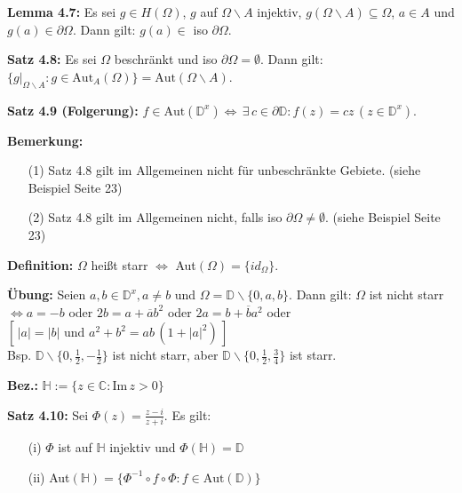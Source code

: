 \documentclass[11pt]{article}
\newcommand{\C}{\mathbb{C}}
\newcommand{\D}{\mathbb{D}}
\begin{document}
\textbf{Lemma 4.7:} Es sei $g \in H(\Omega)$, $g$ auf $\Omega \backslash A$ injektiv, $g(\Omega \backslash A) \subseteq \Omega$, $a \in A$ und $g(a) \in \partial \Omega$. Dann gilt: $g(a) \in$ iso $\partial \Omega$.

\textbf{Satz 4.8:} Es sei $\Omega$ beschränkt und iso $\partial \Omega = \emptyset$. Dann gilt: $\{ g|_{\Omega \backslash A} \colon g \in \text{Aut}_A(\Omega)\} = \text{Aut}(\Omega \backslash A)$.

\textbf{Satz 4.9 (Folgerung):} $f \in \text{Aut}(\D^x) \Leftrightarrow \, \exists \, c \in \partial \D \colon f(z) = cz \, (z \in \D^x)$.

\textbf{Bemerkung:}
\vspace{-0.6cm}
\begin{itemize}
\item[(1)] Satz 4.8 gilt im Allgemeinen nicht für unbeschränkte Gebiete. (siehe Beispiel Seite 23) \vspace{-0.2cm}
\item[(2)] Satz 4.8 gilt im Allgemeinen nicht, falls iso $\partial \Omega \neq \emptyset$. (siehe Beispiel Seite 23)
\end{itemize}
\vspace{-0.3cm}

\textbf{Definition:} $\Omega$ heißt starr $\Leftrightarrow$ Aut$(\Omega) = \{ id_\Omega\}$.

\textbf{Übung:} Seien $a,b \in \D^x, a \neq b$ und $\Omega = \D \backslash \{ 0,a,b \}$. Dann gilt: $\Omega$ ist nicht starr $\Leftrightarrow a= -b$ oder $2b = a + \overline{a}b^2$ oder $2a = b+\overline{b}a^2$ oder $[\,|a|=|b| \text{ und } a^2 + b^2 = ab\,(1+|a|^2)\,]$ \\
Bsp. $\D \backslash \{ 0, \frac{1}{2}, -\frac{1}{2}\}$ ist nicht starr, aber $\D \backslash \{ 0, \frac{1}{2}, \frac{3}{4}\}$ ist starr.


\textbf{Bez.:} $\mathbb{H} := \{ z \in \C \colon \text{Im}\, z > 0\}$ 

\textbf{Satz 4.10:} Sei $\Phi(z) = \frac{z-i}{z+i}$. Es gilt:
\vspace{-0.6cm}
\begin{itemize}
\item[(i)] $\Phi$ ist auf $\mathbb{H}$ injektiv und $\Phi(\mathbb{H}) = \D$ \vspace{-0.2cm}
\item[(ii)] Aut$(\mathbb{H}) = \{ \Phi^{-1} \circ f \circ \Phi \colon f \in \text{Aut}(\D) \}$
\end{itemize}
\vspace{-0.3cm}
\end{document}
